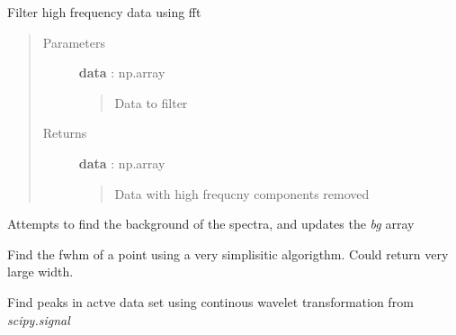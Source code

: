 \documentclass[letterpaper,10pt,english]{sphinxmanual}
\begin{document}
\begin{fulllineitems}

\begin{fulllineitems}
\label{spectra:spectra.Spectra.filter_high_freq}
Filter high frequency data using fft
\begin{quote}\begin{description}
\item[{Parameters}] \leavevmode
\textbf{data} : np.array
\begin{quote}

Data to filter
\end{quote}

\item[{Returns}] \leavevmode
\textbf{data} : np.array
\begin{quote}

Data with high frequcny components removed
\end{quote}

\end{description}\end{quote}

\end{fulllineitems}


\begin{fulllineitems}
\label{spectra:spectra.Spectra.find_background}
Attempts to find the background of the spectra, 
and updates the \emph{bg} array

\end{fulllineitems}


\begin{fulllineitems}
\label{spectra:spectra.Spectra.find_fwhm}
Find the fwhm of a point using a very simplisitic algorigthm. 
Could return very large width.

\end{fulllineitems}


\begin{fulllineitems}
\label{spectra:spectra.Spectra.find_peaks}
Find peaks in actve data set using continous wavelet 
transformation from \emph{scipy.signal}


\end{fulllineitems}
\end{fulllineitems}
\end{document}

